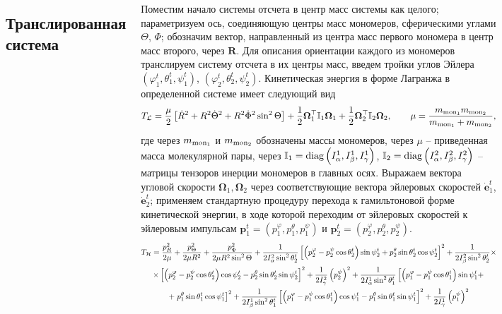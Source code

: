 \documentclass[
  14pt,
  a1paper,
  portrait, 
  margin=0mm,
  innermargin=15mm,
  blockverticalspace=0mm,
  colspace=0mm,
  subcolspace=0mm
]{tikzposter}
\newcommand{\lb}{\left(}
\newcommand{\rb}{\right)}
\newcommand{\lsq}{\left[}
\newcommand{\rsq}{\right]}
\newcommand{\mL}{\mathcal{L}}
\newcommand{\mH}{\mathcal{H}}
\newcommand{\bbI}{\mathbb{I}}
\newcommand{\bOmega}{\boldsymbol{\Omega}}
\begin{document}
\begin{columns}
{	\subsection*{Транслированная система}
	Поместим начало системы отсчета в центр масс системы как целого; параметризуем ось, соединяющую центры масс мономеров, сферическими углами $\Theta$, $\Phi$; обозначим вектор, направленный из центра масс первого мономера в центр масс второго, через $\mathbf{R}$. Для описания ориентации каждого из мономеров транслируем систему отсчета в их центры масс, введем тройки углов Эйлера $\lb \varphi_1^t, \theta_1^t, \psi_1^t \rb$, $\lb \varphi_2^t, \theta_2^t, \psi_2^t \rb$. Кинетическая энергия в форме Лагранжа в определенной системе имеет следующий вид
	\begin{gather}
		T_\mL = \frac{\mu}{2} \lsq \dot{R}^2 + R^2 \dot{\Theta}^2 + R^2 \dot{\Phi}^2 \sin^2 \Theta \rsq + \frac{1}{2} \bOmega_1^\top \bbI_1 \bOmega_1 + \frac{1}{2} \bOmega_2^\top \bbI_2 \bOmega_2, \qquad \mu = \frac{m_{\textup{mon}_1} m_{\textup{mon}_2}}{m_{\textup{mon}_1} + m_{\textup{mon}_2}}, \label{1.3} 
	\end{gather}
	где через $m_{\textup{mon}_1}$ и $m_{\textup{mon}_2}$ обозначены массы мономеров, через $\mu$ -- приведенная масса молекулярной пары, через $\bbI_1 = \textup{diag} \lb I_\alpha^1, I_\beta^1, I_\gamma^1 \rb $, $\bbI_2 = \textup{diag} \lb I_\alpha^2, I_\beta^2, I_\gamma^2 \rb $ -- матрицы тензоров инерции мономеров в главных осях. Выражаем вектора угловой скорости $\bOmega_1, \bOmega_2$ через соответствующие вектора эйлеровых скоростей $\dot{\mathbf{e}}_1^t$, $\dot{\mathbf{e}}_2^t$; применяем стандартную процедуру перехода к гамильтоновой форме кинетической энергии, в ходе которой переходим от эйлеровых скоростей к эйлеровым импульсам $\mathbf{p}_1^t = \lb p_1^\varphi, p_1^\theta, p_1^\psi \rb$ и $\mathbf{p}_2^t = \lb p_2^\varphi, p_2^\theta, p_2^\psi \rb$.   
	\begin{gather}
		T_\mH = \frac{p_R^2}{2\mu} + \frac{p_\Theta^2}{2 \mu R^2} + \frac{p_\Phi^2}{2 \mu R^2 \sin^2 \Theta} + \frac{1}{2 I_\alpha^2 \sin^2 \theta_2^t} \lsq \lb p_2^\varphi - p_2^\psi \cos \theta_2^t \rb \sin \psi_2^t + p_2^\theta \sin \theta_2^t \cos \psi_2^t \rsq^2 + \frac{1}{2 I_\beta^2 \sin^2 \theta_2^t} \times \notag \\
		\times \lsq \lb p_2^\varphi - p_2^\psi \cos \theta_2^t \rb \cos \psi_2^t  - p_2^\theta \sin \theta_2^t \sin \psi_2^t \rsq^2 + \frac{1}{2 I_\gamma^2} \lb p_2^\psi \rb^2 + \frac{1}{2 I_\alpha^1 \sin^2 \theta_1^t} \lsq \lb p_1^\varphi - p_1^\psi \cos \theta_1^t \rb \sin \psi_1^t + \right. \notag \\ 
		+ \left. p_1^\theta \sin \theta_1^t \cos \psi_1^t \rsq^2 + \frac{1}{2 I_\beta^1 \sin^2 \theta_1^t} \lsq \lb p_1^\varphi - p_1^\psi \cos \theta_1^t \rb \cos \psi_1^t - p_1^\theta \sin \theta_1^t \sin \psi_1^t \rsq^2 + \frac{1}{2 I_\gamma^1} \lb p_1^\psi \rb^2 \label{1.4}   
	\end{gather}

}
\end{columns}
\end{document}

